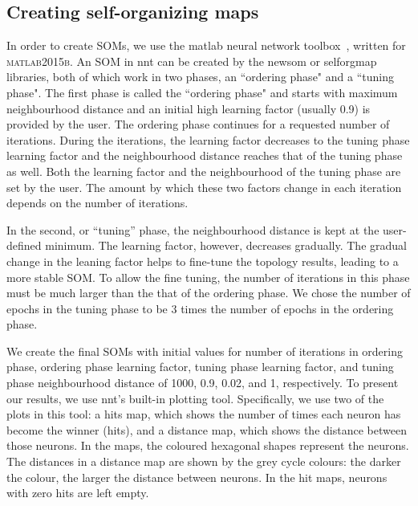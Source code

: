 \subsection{Creating self-organizing maps}
\label{sec: create_som}
     In order to create SOMs, we use the {\sc matlab} neural network toolbox~\citep[NNT,][]{matlabtolbox}, written for \textsc{matlab2015b}. 
     An SOM in {\sc nnt} can be created by the {\sc newsom} or {\sc selforgmap} libraries, both of which work in two phases, an ``ordering phase" and a ``tuning phase". 
     The first phase is called the ``ordering phase" and
     starts with maximum neighbourhood distance and an initial high learning factor (usually 0.9) is provided by the user. 
     The ordering phase continues for a requested number of iterations.
     During the iterations, the learning factor decreases to the tuning phase learning factor and the neighbourhood distance reaches that of the tuning phase as well.
     Both the learning factor and the neighbourhood of the tuning phase are set by the user. 
     The amount by which these two factors change in each iteration depends on the number of iterations.
     
     In the second, or ``tuning'' phase,
     the neighbourhood distance is kept at the user-defined minimum.
     The learning factor, however, decreases gradually.
     The gradual change in the leaning factor helps to fine-tune the topology results, leading to a more stable SOM. 
     To allow the fine tuning, the number of iterations in this phase must be much larger than the that of the ordering phase. 
     We chose the number of epochs in the tuning phase to be 3 times the number of epochs in the ordering phase.
     
     We create the final SOMs with initial values for number of iterations in ordering phase, ordering phase learning factor, tuning phase learning factor, and tuning phase neighbourhood distance of 1000, 0.9, 0.02, and 1, respectively. 
     To present our results, we use {\sc nnt}'s built-in plotting tool.
     Specifically, we use two of the plots in this tool: a hits map, which shows the number of times each neuron has become the winner (hits), and a distance map, which shows the distance between those neurons.
     In the maps, the coloured hexagonal shapes represent the neurons. 
     The distances in a distance map are shown by the grey cycle colours:
     the darker the colour, the larger the distance between neurons.
     In the hit maps, neurons with zero hits are left empty.
     
